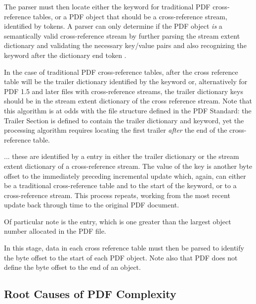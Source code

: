 The parser must then locate either the  keyword for
traditional PDF cross-reference tables, or a PDF object that should be
a cross-reference stream, identified by  tokens. 
A parser can only determine if the PDF object \emph{is} a
semantically valid cross-reference stream by further parsing the stream extent dictionary and 
validating the necessary key/value pairs and also recognizing the  keyword after the dictionary end token \lstcd{>>}. 

In the case of traditional PDF
cross-reference tables, after the cross reference table will be the
trailer dictionary identified by the  keyword or,
alternatively for PDF 1.5 and later files with cross-reference
streams, the trailer dictionary keys should be in the stream extent
dictionary of the cross reference stream. Note that this algorithm is at
odds with the file structure defined in the PDF Standard: the Trailer Section is defined
to contain the trailer dictionary and  keyword, yet the processing algorithm
requires locating the first trailer \emph{after} the end of the cross-reference table. 

... these are identified by a  entry in either the trailer
dictionary or the stream extent dictionary of a cross-reference stream. The
value of the  key is another byte offset to the immediately
preceding incremental update which, again, can either be a traditional
cross-reference table and to the start of the  keyword, or to a
cross-reference stream. This process repeats, working from the most recent
update back through time to the original PDF document.

Of particular note is the  entry, which
is one greater than the largest object number allocated in the PDF
file.

In this stage, data in each cross reference table must then be parsed to
identify the byte offset to the start of each PDF object. Note also that PDF
does not define the byte offset to the end of an object.


\subsection{Root Causes of PDF Complexity}

